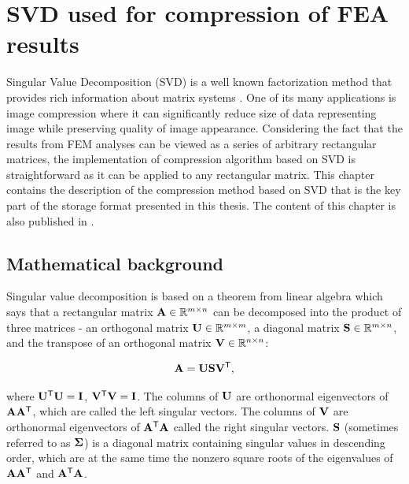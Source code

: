 \chapter{SVD used for compression of FEA results}
\label{chapter:SVD}

Singular Value Decomposition (SVD) is a well known factorization method that provides rich information about matrix systems \cite{Baker2005, Kalman1996, Golub1996, Duintjer2012}. One of its many applications is image compression where it can significantly reduce size of data representing image while preserving quality of image appearance. Considering the fact that the results from FEM analyses can be viewed as a series of arbitrary rectangular matrices, the implementation of compression algorithm based on SVD is straightforward as it can be applied to any rectangular matrix. This chapter contains the description of the compression method based on SVD that is the key part of the storage format presented in this thesis. The content of this chapter is also published in \cite{Benes2018}.


\section{Mathematical background}

Singular value decomposition is based on a theorem from linear algebra which says that a rectangular matrix $\mathbf{A} \in \mathbb{R}^{m \times n}$ can be decomposed into the product of three matrices - an orthogonal matrix $\mathbf{U} \in \mathbb{R}^{m \times m}$, a diagonal
matrix $\mathbf{S} \in \mathbb{R}^{m \times n}$, and the transpose of an orthogonal matrix $\mathbf{V} \in \mathbb{R}^{n \times n}$:

\begin{equation}
\mathbf{A} = \mathbf{U} \mathbf{S} \mathbf{V}^\mathsf{T},
\label{eq:svd-def}
\end{equation}

\noindent
where $\mathbf{U^\mathsf{T}U} = \mathbf{I}$, $\mathbf{V^\mathsf{T}V} = \mathbf{I}$. The columns of $\mathbf{U}$ are orthonormal eigenvectors of $\mathbf{AA^\mathsf{T}}$, which are called the left singular vectors. The columns of $\mathbf{V}$ are orthonormal eigenvectors of $\mathbf{A^\mathsf{T}A}$ called the right singular vectors. $\mathbf{S}$ (sometimes referred to as $\mathbf{\Sigma}$) is a diagonal matrix containing singular values in descending order, which are at the same time the nonzero square roots of the eigenvalues of $\mathbf{AA^\mathsf{T}}$ and $\mathbf{A^\mathsf{T}A}$.

